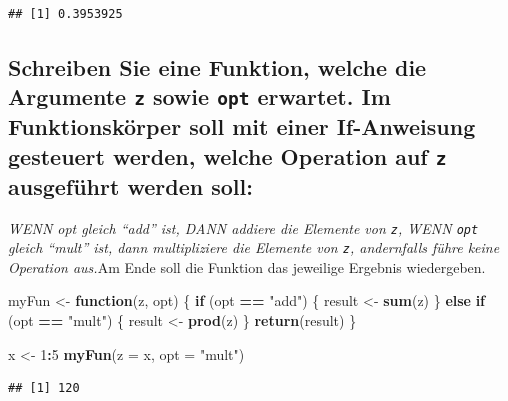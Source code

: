 \documentclass[12pt,a4paper]{article}
\newenvironment{Shaded}{\begin{snugshade}}{\end{snugshade}}
\newcommand{\AttributeTok}[1]{\textcolor[rgb]{0.13,0.29,0.53}{#1}}
\newcommand{\ControlFlowTok}[1]{\textcolor[rgb]{0.13,0.29,0.53}{\textbf{#1}}}
\newcommand{\DecValTok}[1]{\textcolor[rgb]{0.00,0.00,0.81}{#1}}
\newcommand{\FunctionTok}[1]{\textcolor[rgb]{0.13,0.29,0.53}{\textbf{#1}}}
\newcommand{\NormalTok}[1]{#1}
\newcommand{\OtherTok}[1]{\textcolor[rgb]{0.56,0.35,0.01}{#1}}
\newcommand{\SpecialCharTok}[1]{\textcolor[rgb]{0.81,0.36,0.00}{\textbf{#1}}}
\newcommand{\StringTok}[1]{\textcolor[rgb]{0.31,0.60,0.02}{#1}}
\begin{document}
\begin{verbatim}
## [1] 0.3953925
\end{verbatim}

\subsection{\texorpdfstring{Schreiben Sie eine Funktion, welche die
Argumente \texttt{z} sowie \texttt{opt} erwartet. Im Funktionskörper
soll mit einer If-Anweisung gesteuert werden, welche Operation auf
\texttt{z} ausgeführt werden
soll:}{Schreiben Sie eine Funktion, welche die Argumente z sowie opt erwartet. Im Funktionskörper soll mit einer If-Anweisung gesteuert werden, welche Operation auf z ausgeführt werden soll:}}\label{schreiben-sie-eine-funktion-welche-die-argumente-z-sowie-opt-erwartet.-im-funktionskuxf6rper-soll-mit-einer-if-anweisung-gesteuert-werden-welche-operation-auf-z-ausgefuxfchrt-werden-soll}

\emph{WENN opt gleich ``add'' ist, DANN addiere die Elemente von
\texttt{z}, WENN \texttt{opt} gleich ``mult'' ist, dann multipliziere
die Elemente von \texttt{z}, andernfalls führe keine Operation
aus.}\newline\newline Am Ende soll die Funktion das jeweilige Ergebnis
wiedergeben.

\begin{Shaded}
\begin{Highlighting}[]
\NormalTok{    myFun }\OtherTok{\textless{}{-}} \ControlFlowTok{function}\NormalTok{(z, opt) \{}
      \ControlFlowTok{if}\NormalTok{ (opt }\SpecialCharTok{==} \StringTok{"add"}\NormalTok{) \{}
\NormalTok{        result }\OtherTok{\textless{}{-}} \FunctionTok{sum}\NormalTok{(z)}
\NormalTok{      \} }\ControlFlowTok{else} \ControlFlowTok{if}\NormalTok{ (opt }\SpecialCharTok{==} \StringTok{"mult"}\NormalTok{) \{}
\NormalTok{        result }\OtherTok{\textless{}{-}} \FunctionTok{prod}\NormalTok{(z)}
\NormalTok{      \}}
      \FunctionTok{return}\NormalTok{(result)}
\NormalTok{    \}}
    
\NormalTok{    x }\OtherTok{\textless{}{-}} \DecValTok{1}\SpecialCharTok{:}\DecValTok{5}
    \FunctionTok{myFun}\NormalTok{(}\AttributeTok{z =}\NormalTok{ x, }\AttributeTok{opt =} \StringTok{"mult"}\NormalTok{)}
\end{Highlighting}
\end{Shaded}

\begin{verbatim}
## [1] 120
\end{verbatim}
\end{document}
